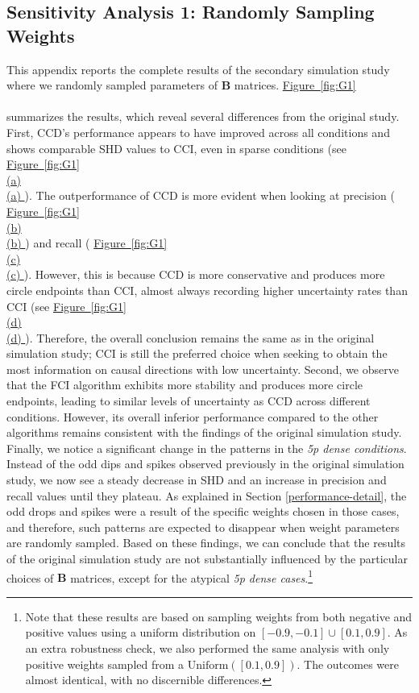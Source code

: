 \documentclass[twoside, 11pt]{article}
\newcommand*{\figref}[2][]{%
  \hyperref[{fig:#2}]{%
    Figure~\ref*{fig:#2}%
    \ifx\\#1\\%
    \else
      #1%
    \fi
  }%
}
\begin{document}
\begin{appendices}
\section{Sensitivity Analysis 1: Randomly Sampling Weights}\label{varyingbeta}
This appendix reports the complete results of the secondary simulation study where we randomly sampled parameters of $\mathbf{B}$ matrices. \figref[]{G1} summarizes the results, which reveal several differences from the original study. First, CCD's performance appears to have improved across all conditions and shows comparable SHD values to CCI, even in sparse conditions (see \figref[(a)]{G1}). The outperformance of CCD is more evident when looking at precision (\figref[(b)]{G1}) and recall (\figref[(c)]{G1}). However, this is because CCD is more conservative and produces more circle endpoints than CCI, almost always recording higher uncertainty rates than CCI (see \figref[(d)]{G1}). Therefore, the overall conclusion remains the same as in the original simulation study; CCI is still the preferred choice when seeking to obtain the most information on causal directions with low uncertainty. Second, we observe that the FCI algorithm exhibits more stability and produces more circle endpoints, leading to similar levels of uncertainty as CCD across different conditions. However, its overall inferior performance compared to the other algorithms remains consistent with the findings of the original simulation study. Finally, we notice a significant change in the patterns in the \textit{5p dense conditions}. Instead of the odd dips and spikes observed previously in the original simulation study, we now see a steady decrease in SHD and an increase in precision and recall values until they plateau. As explained in Section \ref{performance-detail}, the odd drops and spikes were a result of the specific weights chosen in those cases, and therefore, such patterns are expected to disappear when weight parameters are randomly sampled. Based on these findings, we can conclude that the results of the original simulation study are not substantially influenced by the particular choices of $\mathbf{B}$ matrices, except for the atypical \textit{5p dense cases}.\footnote{Note that these results are based on sampling weights from both negative and positive values using a uniform distribution on $[-0.9, -0.1] \cup [0.1,  0.9]$. As an extra robustness check, we also performed the same analysis with only positive weights sampled from a $\text{Uniform}([0.1, 0.9])$. The outcomes were almost identical, with no discernible differences.}


\end{appendices}
\end{document}
